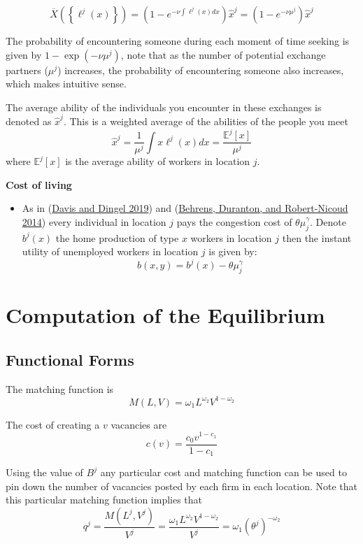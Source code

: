 \documentclass[
  letterpaper,
  DIV=11,
  numbers=noendperiod]{scrreprt}
\providecommand{\tightlist}{%
  \setlength{\itemsep}{0pt}\setlength{\parskip}{0pt}}\usepackage{longtable,booktabs,array}
\begin{document}
\[
    \overline{X}\left(\left\{\ell^j(x)\right\}\right) = \left(1 - e^{-\nu \int \ell^j(x) dx}\right)\hat{x}^j =\left(1 - e^{-\nu \mu^j} \right)\hat{x}^j
\]

The probability of encountering someone during each moment of time
seeking is given by \(1 - \exp(-ν \mu^j)\), note that as the number of
potential exchange partners (\(\mu^j\)) increases, the probability of
encountering someone also increases, which makes intuitive sense.

The average ability of the individuals you encounter in these exchanges
is denoted as \(\hat{x}^j\). This is a weighted average of the abilities
of the people you meet
\[\hat{x}^j = \frac{1}{\mu^j}\int{x\ell^j(x)dx}=\frac{\mathbb{E}^j[x]}{\mu^j}\]
where \(\mathbb{E}^j[x]\) is the average ability of workers in location
\(j\).

\textbf{Cost of living}

\begin{itemize}
\tightlist
\item
  As in (\protect\hyperlink{ref-davisSpatialKnowledgeEconomy2019}{Davis
  and Dingel 2019}) and
  (\protect\hyperlink{ref-behrensProductiveCitiesSorting2014a}{Behrens,
  Duranton, and Robert-Nicoud 2014}) every individual in location \(j\)
  pays the congestion cost of \(\theta\mu_j^{\gamma}\). Denote
  \(b^j(x)\) the home production of type \(x\) workers in location \(j\)
  then the instant utility of unemployed workers in location \(j\) is
  given by: \[b(x,y) = b^j(x) - \theta\mu_j^{\gamma}\]
\end{itemize}


\hypertarget{computation-of-the-equilibrium}{%
\chapter{Computation of the
Equilibrium}\label{computation-of-the-equilibrium}}

\hypertarget{functional-forms}{%
\section{Functional Forms}\label{functional-forms}}

The matching function is
\[M(L, V) = \omega_1 L^{\omega_2}V^{1-\omega_2}\]

The cost of creating a \(v\) vacancies are
\[c(v) = \frac{c_0 v^{1-c_1}}{1 - c_1}\]

Using the value of \(B^j\) any particular cost and matching function can
be used to pin down the number of vacancies posted by each firm in each
location. Note that this particular matching function implies that
\[q^j = \frac{M(L^j, V^j)}{V^j}=\frac{\omega_1 L^{\omega_2} V^{1 - \omega_2}}{V^j}= \omega_1(\theta^j)^{-\omega_2}\]
\end{document}
